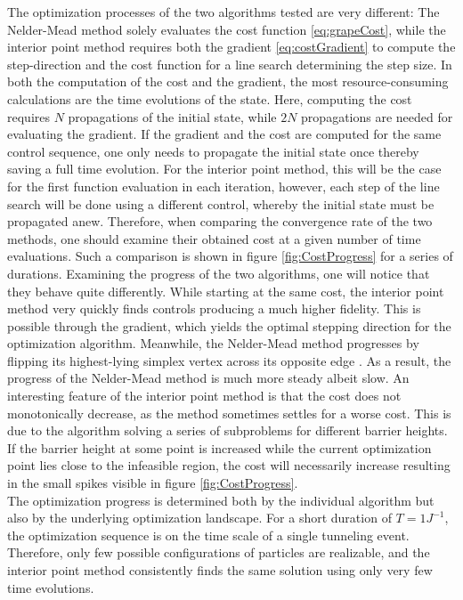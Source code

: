 The optimization processes of the two algorithms tested are very different: The Nelder-Mead method solely evaluates the cost function \eqref{eq:grapeCost}, while the interior point method requires both the gradient \eqref{eq:costGradient} to compute the step-direction and the cost function for a line search determining the step size. In both the computation of the cost and the gradient, the most resource-consuming calculations are the time evolutions of the state. Here, computing the cost requires $N$ propagations of the initial state, while $2 N$ propagations are needed for evaluating the gradient. If the gradient and the cost are computed for the same control sequence, one only needs to propagate the initial state once thereby saving a full time evolution. For the interior point method, this will be the case for the first function evaluation in each iteration, however, each step of the line search will be done using a different control, whereby the initial state must be propagated anew.
Therefore, when comparing the convergence rate of the two methods, one should examine their obtained cost at a given number of time evaluations. Such a comparison is shown in figure \ref{fig:CostProgress} for a series of durations. Examining the progress of the two algorithms, one will notice that they behave quite differently. While starting at the same cost, the interior point method very quickly finds controls producing a much higher fidelity. This is possible through the gradient, which yields the optimal stepping direction for the optimization algorithm. Meanwhile, the Nelder-Mead method progresses by flipping its highest-lying simplex vertex across its opposite edge \cite{wright}. As a result, the progress of the Nelder-Mead method is much more steady albeit slow.
An interesting feature of the interior point method is that the cost does not monotonically decrease, as the method sometimes settles for a worse cost. This is due to the algorithm solving a series of subproblems for different barrier heights. If the barrier height at some point is increased while the current optimization point lies close to the infeasible region, the cost will necessarily increase resulting in the small spikes visible in figure \ref{fig:CostProgress}.\\

The optimization progress is determined both by the individual algorithm but also by the underlying optimization landscape. For a short duration of $T=1 J^{-1}$, the optimization sequence is on the time scale of a single tunneling event. Therefore, only few possible configurations of particles are realizable, and the interior point method consistently finds the same solution using only very few time evolutions.

